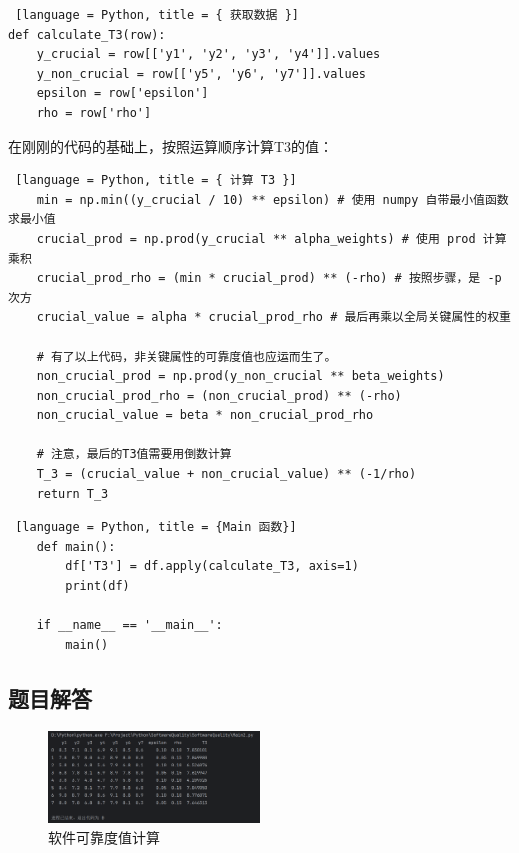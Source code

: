 \begin{lstlisting} [language = Python, title = { 获取数据 }]
def calculate_T3(row):
    y_crucial = row[['y1', 'y2', 'y3', 'y4']].values
    y_non_crucial = row[['y5', 'y6', 'y7']].values
    epsilon = row['epsilon']
    rho = row['rho']
\end{lstlisting}

在刚刚的代码的基础上，按照运算顺序计算T3的值：
\begin{lstlisting} [language = Python, title = { 计算 T3 }]
    min = np.min((y_crucial / 10) ** epsilon) # 使用 numpy 自带最小值函数求最小值
    crucial_prod = np.prod(y_crucial ** alpha_weights) # 使用 prod 计算乘积
    crucial_prod_rho = (min * crucial_prod) ** (-rho) # 按照步骤，是 -p 次方
    crucial_value = alpha * crucial_prod_rho # 最后再乘以全局关键属性的权重

    # 有了以上代码，非关键属性的可靠度值也应运而生了。
    non_crucial_prod = np.prod(y_non_crucial ** beta_weights)
    non_crucial_prod_rho = (non_crucial_prod) ** (-rho)
    non_crucial_value = beta * non_crucial_prod_rho

    # 注意，最后的T3值需要用倒数计算
    T_3 = (crucial_value + non_crucial_value) ** (-1/rho)
    return T_3
\end{lstlisting}

\begin{lstlisting} [language = Python, title = {Main 函数}]
    def main():
        df['T3'] = df.apply(calculate_T3, axis=1)
        print(df)

    if __name__ == '__main__':
        main()
\end{lstlisting}

\subsection{题目解答}

\begin{figure} [H]
    \centering
    \includegraphics[width=0.5\textwidth]{img5/result2.png}
    \caption{软件可靠度值计算}
    \label{fig:result2}
\end{figure}

